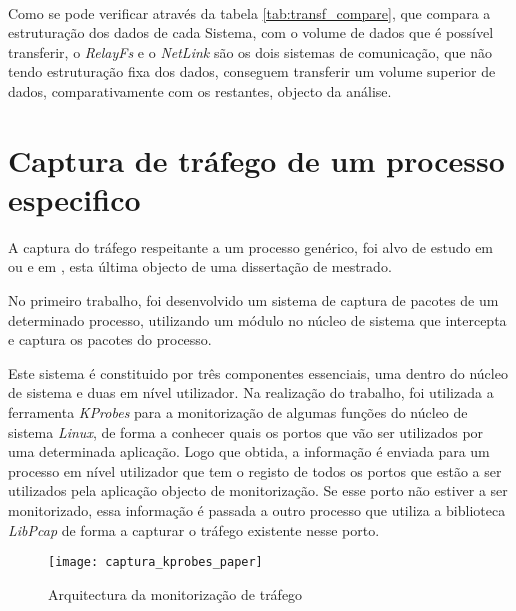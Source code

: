\paragraph*{}
Como se pode verificar através da tabela \ref{tab:transf_compare}, que compara a estruturação dos dados de cada Sistema, com o volume de dados que é possível transferir, o \textit{RelayFs} e o \textit{NetLink} são os dois sistemas de comunicação, que não tendo estruturação fixa dos dados, conseguem transferir um volume superior de dados, comparativamente com os restantes, objecto da análise.

 
\section{Captura de tráfego de um processo especifico}
\label{sect:outras_abordagens}

A captura do tráfego respeitante a um processo genérico, foi alvo de estudo em \cite{1688981} ou e em \cite{Farruca:2009}, esta última objecto de uma dissertação de mestrado.

No primeiro trabalho, foi desenvolvido um sistema de captura de pacotes de um determinado processo, utilizando um módulo no núcleo de sistema que intercepta e captura os pacotes do processo.

Este sistema é constituido por três componentes essenciais, uma dentro do núcleo de sistema e duas em nível utilizador.
Na realização do trabalho, foi utilizada a ferramenta \textit{KProbes} para a monitorização de algumas funções do núcleo de sistema \textit{Linux}, de forma a conhecer quais os portos que vão ser utilizados por uma determinada aplicação.
Logo que obtida, a informação é enviada para um processo em nível utilizador que tem o registo de todos os portos que estão a ser utilizados pela aplicação objecto de monitorização.
Se esse porto não estiver a ser monitorizado, essa informação é passada a outro processo que utiliza a biblioteca \textit{LibPcap} de forma a capturar o tráfego existente nesse porto.


\begin{figure}[h!]
       \centering
       \texttt{[image: captura\_kprobes\_paper]}
       \caption{Arquitectura da monitorização de tráfego}
	\label{fig:paper_capture_kprobes}
\end{figure}


